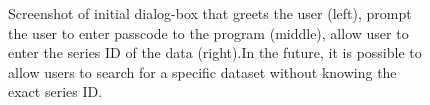 \documentclass[12pt]{article}
\begin{document}
\begin{figure}[htb]

\caption{Screenshot of initial dialog-box that greets the user (left),
prompt the user to enter passcode to the program (middle),
allow user to enter the series ID of the data (right).In the future, it is possible to allow users to search for a specific dataset without knowing the exact series ID.}

\label{fig:initial screens}
\end{figure}
\end{document}
